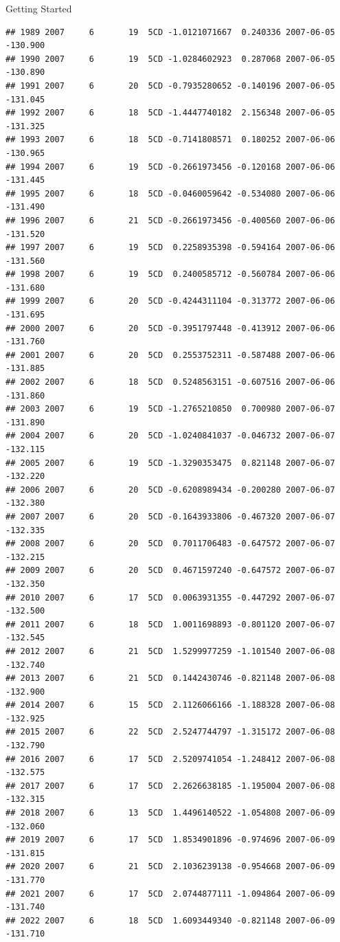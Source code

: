 \documentclass[
  ignorenonframetext,
]{beamer}
\begin{document}
\begin{frame}[fragile]{Getting Started}
\begin{verbatim}
## 1989 2007     6       19  5CD -1.0121071667  0.240336 2007-06-05 -130.900
## 1990 2007     6       19  5CD -1.0284602923  0.287068 2007-06-05 -130.890
## 1991 2007     6       20  5CD -0.7935280652 -0.140196 2007-06-05 -131.045
## 1992 2007     6       18  5CD -1.4447740182  2.156348 2007-06-05 -131.325
## 1993 2007     6       18  5CD -0.7141808571  0.180252 2007-06-06 -130.965
## 1994 2007     6       19  5CD -0.2661973456 -0.120168 2007-06-06 -131.445
## 1995 2007     6       18  5CD -0.0460059642 -0.534080 2007-06-06 -131.490
## 1996 2007     6       21  5CD -0.2661973456 -0.400560 2007-06-06 -131.520
## 1997 2007     6       19  5CD  0.2258935398 -0.594164 2007-06-06 -131.560
## 1998 2007     6       19  5CD  0.2400585712 -0.560784 2007-06-06 -131.680
## 1999 2007     6       20  5CD -0.4244311104 -0.313772 2007-06-06 -131.695
## 2000 2007     6       20  5CD -0.3951797448 -0.413912 2007-06-06 -131.760
## 2001 2007     6       20  5CD  0.2553752311 -0.587488 2007-06-06 -131.885
## 2002 2007     6       18  5CD  0.5248563151 -0.607516 2007-06-06 -131.860
## 2003 2007     6       19  5CD -1.2765210850  0.700980 2007-06-07 -131.890
## 2004 2007     6       20  5CD -1.0240841037 -0.046732 2007-06-07 -132.115
## 2005 2007     6       19  5CD -1.3290353475  0.821148 2007-06-07 -132.220
## 2006 2007     6       20  5CD -0.6208989434 -0.200280 2007-06-07 -132.380
## 2007 2007     6       20  5CD -0.1643933806 -0.467320 2007-06-07 -132.335
## 2008 2007     6       20  5CD  0.7011706483 -0.647572 2007-06-07 -132.215
## 2009 2007     6       20  5CD  0.4671597240 -0.647572 2007-06-07 -132.350
## 2010 2007     6       17  5CD  0.0063931355 -0.447292 2007-06-07 -132.500
## 2011 2007     6       18  5CD  1.0011698893 -0.801120 2007-06-07 -132.545
## 2012 2007     6       21  5CD  1.5299977259 -1.101540 2007-06-08 -132.740
## 2013 2007     6       21  5CD  0.1442430746 -0.821148 2007-06-08 -132.900
## 2014 2007     6       15  5CD  2.1126066166 -1.188328 2007-06-08 -132.925
## 2015 2007     6       22  5CD  2.5247744797 -1.315172 2007-06-08 -132.790
## 2016 2007     6       17  5CD  2.5209741054 -1.248412 2007-06-08 -132.575
## 2017 2007     6       17  5CD  2.2626638185 -1.195004 2007-06-08 -132.315
## 2018 2007     6       13  5CD  1.4496140522 -1.054808 2007-06-09 -132.060
## 2019 2007     6       17  5CD  1.8534901896 -0.974696 2007-06-09 -131.815
## 2020 2007     6       21  5CD  2.1036239138 -0.954668 2007-06-09 -131.770
## 2021 2007     6       17  5CD  2.0744877111 -1.094864 2007-06-09 -131.740
## 2022 2007     6       18  5CD  1.6093449340 -0.821148 2007-06-09 -131.710

\end{verbatim}
\end{frame}
\end{document}
